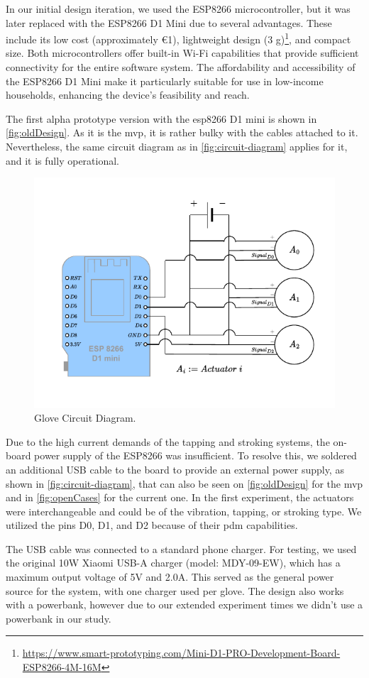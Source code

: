 In our initial design iteration, we used the ESP8266 microcontroller, but it was later replaced with the ESP8266 D1 Mini due to several advantages. These include its low cost (approximately €1), lightweight design (3 g)\footnote{\url{https://www.smart-prototyping.com/Mini-D1-PRO-Development-Board-ESP8266-4M-16M}}, and compact size. Both microcontrollers offer built-in Wi-Fi capabilities that provide sufficient connectivity for the entire software system. The affordability and accessibility of the ESP8266 D1 Mini make it particularly suitable for use in low-income households, enhancing the device's feasibility and reach.

The first alpha prototype version with the esp8266 D1 mini is shown in \autoref{fig:oldDesign}. As it is the \gls{mvp}, it is rather bulky with the cables attached to it. Nevertheless, the same circuit diagram as in \autoref{fig:circuit-diagram} applies for it, and it is fully operational.

\begin{figure}
    \centering
    \includegraphics[width=0.5\linewidth]{src/pictures/CircuitDiagramGlove.drawio.pdf}
    \caption{Glove Circuit Diagram.}
    \label{fig:circuit-diagram}
\end{figure}


Due to the high current demands of the tapping and stroking systems, the on-board power supply of the ESP8266 was insufficient. To resolve this, we soldered an additional USB cable to the board to provide an external power supply, as shown in \autoref{fig:circuit-diagram}, that can also be seen on \autoref{fig:oldDesign} for the \gls{mvp} and in \autoref{fig:openCases} for the current one.
In the first experiment, the actuators were interchangeable and could be of the vibration, tapping, or stroking type.
We utilized the pins D0, D1, and D2 because of their \gls{pdm} capabilities.

The USB cable was connected to a standard phone charger. For testing, we used the original 10W Xiaomi USB-A charger (model: MDY-09-EW), which has a maximum output voltage of 5V and 2.0A. This served as the general power source for the system, with one charger used per glove. The design also works with a powerbank, however due to our extended experiment times we didn't use a powerbank in our study.

